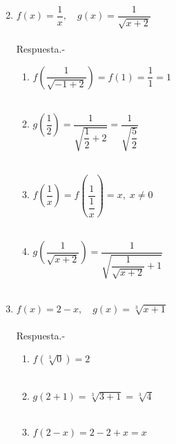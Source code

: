 \begin{enumerate}
\begin{multicols}{2}
\begin{enumerate}[\bfseries a)]
\end{enumerate}
\end{multicols}

\item $f(x) = \dfrac{1}{x}, \quad g(x)=\dfrac{1}{\sqrt{x+2}}$\\\\
    Respuesta.-\; 
    \begin{enumerate}[\bfseries a)]

	\item $f\left(\dfrac{1}{\sqrt{-1+2}} \right) = f(1) = \dfrac{1}{1} = 1$\\\\

	\item $g\left(\dfrac{1}{2}\right) = \dfrac{1}{\sqrt{\dfrac{1}{2} + 2}} = \dfrac{1}{\sqrt{\dfrac{5}{2}}}$\\\\

	\item $f\left(\dfrac{1}{x}\right) = f\left(\dfrac{1}{\dfrac{1}{x}}\right) = x,\; x\neq 0$\\\\

	\item $g\left(\dfrac{1}{\sqrt{x+2}}\right) = \dfrac{1}{\sqrt{\dfrac{1}{\sqrt{x+2}}+1}}$\\\\
	    
    \end{enumerate}

\item $f(x) = 2-x, \quad g(x) = \sqrt[3]{x+1}$\\\\
    Respuesta.-\; 

    \begin{enumerate}[\bfseries a)]

	\item $f(\sqrt[3]{0}) = 2$\\\\

	\item $g(2+1) = \sqrt[3]{3 + 1} = \sqrt[3]{4}$\\\\

	\item $f(2-x) = 2 - 2 + x = x$\\\\


\end{enumerate}
\end{enumerate}
